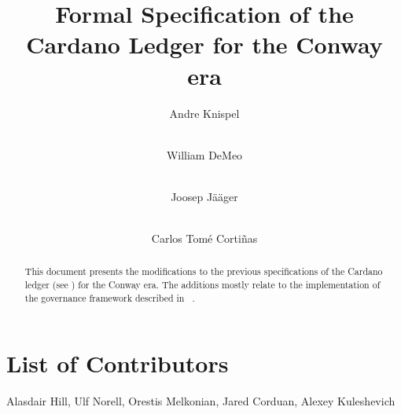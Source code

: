 \documentclass[11pt,a4paper,dvipsnames]{article}
\begin{document}
\title{Formal Specification of the Cardano Ledger for the Conway era}

\author{
   Andre Knispel \\ {\small {}} \\
   \and
   William DeMeo \\ {\small {}} \\
   \and
   Joosep Jääger \\ {\small {}} \\
   \and
   Carlos Tom\'{e} Corti\~{n}as \\ {\small {}}
}

\date{}

\maketitle

\begin{abstract}
  This document presents the modifications to the previous
  specifications of the Cardano ledger (see
  \cite{shelley-ledger-spec,shelley-ma-ledger-spec,alonzo-ledger-spec,babbage-ledger-spec})
  for the Conway era.  The additions mostly relate to the implementation of the governance
  framework described in ~\parencite{cip1694}.
\end{abstract}

\section*{List of Contributors}
\label{acknowledgements}

Alasdair Hill, Ulf Norell, Orestis Melkonian, Jared Corduan, Alexey Kuleshevich

\tableofcontents

\clearpage




\clearpage

\printbibliography

\clearpage

\appendix



\end{document}
